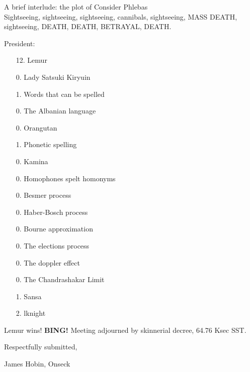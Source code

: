 \documentclass[10pt]{article}
\newcommand{\bing}{{\bf BING!} }
\newcommand{\onseck}{James Hobin, Onseck}
\begin{document}
A brief interlude: the plot of Consider Phlebas \\
Sightseeing, sightseeing, sightseeing, cannibals, sightseeing, MASS DEATH,
sightseeing, DEATH, DEATH, BETRAYAL, DEATH.

President: \\
\begin{itemize}
  \item[12.] Lemur
  \item[0.] Lady Satsuki Kiryuin
  \item[1.] Words that can be spelled
  \item[0.] The Albanian language
  \item[0.] Orangutan
  \item[1.] Phonetic spelling
  \item[0.] Kamina
  \item[0.] Homophones spelt homonyms
  \item[0.] Besmer process
  \item[0.] Haber-Bosch process
  \item[0.] Bourne approximation
  \item[0.] The elections process
  \item[0.] The doppler effect
  \item[0.] The Chandrashakar Limit
  \item[1.] Sansa
  \item[2.] lknight
\end{itemize}

Lemur wins!
\bing
\noindent
Meeting adjourned by skinnerial decree, 64.76 Ksec SST.

\vspace{18pt}

\centerline{Respectfully submitted,}
\centerline{\onseck}
\end{document}
